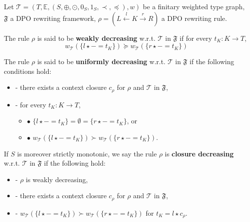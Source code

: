 \begin{definition}
    \label{wf:def:decreasing_rule}
    Let $\mathcal{T} = (T,\mathbb{E}, (S, \oplus, \odot, 0_S, 1_S, \prec, \preceq),w)$ be a finitary weighted type graph, \(\mathfrak{F}\) a DPO rewriting framework, $\rho = (L \overset{l}{\leftarrow} K \overset{r}{\rightarrow} R)$ a DPO rewriting rule.

    \noindent
    The rule $\rho$ is said to be \textbf{weakly decreasing} w.r.t. $\mathcal{T}$ in $\mathfrak{F}$ if 
            for every $t_K : K \to T$,
                $$ 
                  w_\mathcal{T}(\{l \star - = t_K\}) \succeq w_\mathcal{T}(\{r\star - = t_K\})$$
           
    \noindent
    The rule $\rho$ is said to be \textbf{uniformly decreasing} w.r.t. $\mathcal{T}$ in $\mathfrak{F}$ if the following conditions hold:
        \begin{itemize}
            \item[]- there exists a context closure $c_\rho$ for $\rho$ and $\mathcal{T}$ in $\mathfrak{F}$, 
            \item[]- for every $t_K : K \to T$,
            \begin{itemize}
                \item[] $\bullet$ $\{l \star - = t_K\} = \emptyset = \{r \star - = t_K\}$, or
                \item[] $\bullet$ $w_\mathcal{T}(\{l \star - = t_K\}) 
                        \succ   w_\mathcal{T}(\{r \star - = t_K\}) $.
            \end{itemize}
        \end{itemize}  
         
    \noindent
   If $S$ is moreover strictly monotonic, we say the rule $\rho$ is
            \textbf{closure decreasing} w.r.t. $\mathcal{T}$ in $\mathfrak{F}$ if the following hold:
            \begin{itemize}
                \item[]- $\rho$ is weakly decreasing,
                \item[]- there exists a context closure $c_\rho$ for $\rho$ and $\mathcal{T}$ in $\mathfrak{F}$,
                \item[]- $w_\mathcal{T}(\{l \star - = t_K\})  
                \succ  w_\mathcal{T}(\{r \star - = t_K\})$ for $t_K = l \star c_\rho$.
            \end{itemize}
\end{definition}

